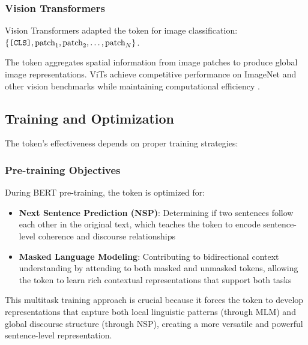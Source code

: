 \subsubsection{Vision Transformers}
Vision Transformers \citep{dosovitskiy2020image} adapted the \cls{} token for image classification:\\
$\{\texttt{[CLS]}{}, \text{patch}_1, \text{patch}_2, \ldots, \text{patch}_N\}$.

The \cls{} token aggregates spatial information from image patches to produce global image representations. ViTs achieve competitive performance on ImageNet \citep{russakovsky2015imagenet, deng2009imagenet} and other vision benchmarks while maintaining computational efficiency \citep{strubell2019energy}.

\subsection{Training and Optimization}

The \cls{} token's effectiveness depends on proper training strategies:

\subsubsection{Pre-training Objectives}
During BERT pre-training, the \cls{} token is optimized for:
\begin{itemize}
\item \textbf{Next Sentence Prediction (NSP)}: Determining if two sentences follow each other in the original text, which teaches the \cls{} token to encode sentence-level coherence and discourse relationships
\item \textbf{Masked Language Modeling}: Contributing to bidirectional context understanding by attending to both masked and unmasked tokens, allowing the \cls{} token to learn rich contextual representations that support both tasks
\end{itemize}

This multitask training approach is crucial because it forces the \cls{} token to develop representations that capture both local linguistic patterns (through MLM) and global discourse structure (through NSP), creating a more versatile and powerful sentence-level representation.

